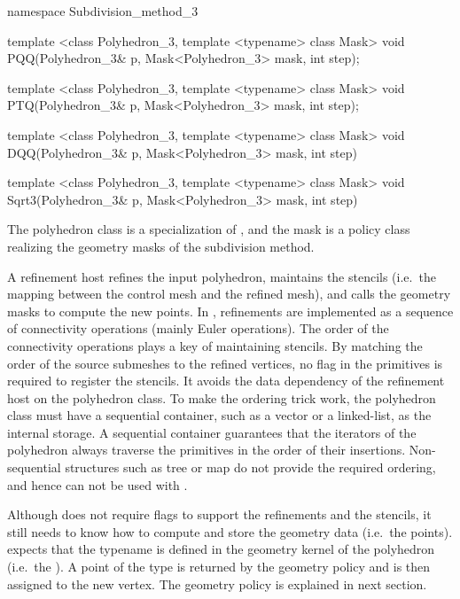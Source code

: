 \begin{ccExampleCode}
namespace Subdivision_method_3 {
  template <class Polyhedron_3, template <typename> class Mask>
  void PQQ(Polyhedron_3& p, Mask<Polyhedron_3> mask, int step);

  template <class Polyhedron_3, template <typename> class Mask>
  void PTQ(Polyhedron_3& p, Mask<Polyhedron_3> mask, int step);

  template <class Polyhedron_3, template <typename> class Mask>
  void DQQ(Polyhedron_3& p, Mask<Polyhedron_3> mask, int step)

  template <class Polyhedron_3, template <typename> class Mask>
  void Sqrt3(Polyhedron_3& p, Mask<Polyhedron_3> mask, int step)
}
\end{ccExampleCode}


The polyhedron class is a specialization of
, and the mask is a policy 
class realizing the geometry masks of the subdivision 
method.

A refinement host refines the input polyhedron, maintains 
the stencils (i.e.~the mapping between the control mesh 
and the refined mesh), and calls the geometry masks
to compute the new points. 
In , refinements are implemented
as a sequence of connectivity operations (mainly Euler operations).
The order of the connectivity operations plays a key of maintaining
stencils. By matching the order of the source submeshes to the refined 
vertices, no flag in the primitives is required to register the stencils. 
It avoids the data dependency of the refinement host on the polyhedron class. 
To make the ordering trick work, the polyhedron class must 
have a sequential container, such as a vector or a linked-list, as
the internal storage. 
A sequential container guarantees that the iterators of the 
polyhedron always traverse the primitives in the order of their 
insertions. Non-sequential structures such as 
tree or map do not provide the required ordering, and hence
can not be used with .
 
Although  does not require flags
to support the refinements and the stencils, it
still needs to know how to compute and store the geometry
data (i.e.~the points).  
expects that the typename  is 
defined in the geometry kernel of the polyhedron
(i.e.~the ). 
A point of the type  is returned by the geometry 
policy and is then assigned to the new vertex.  
The geometry policy is explained in next section. 

